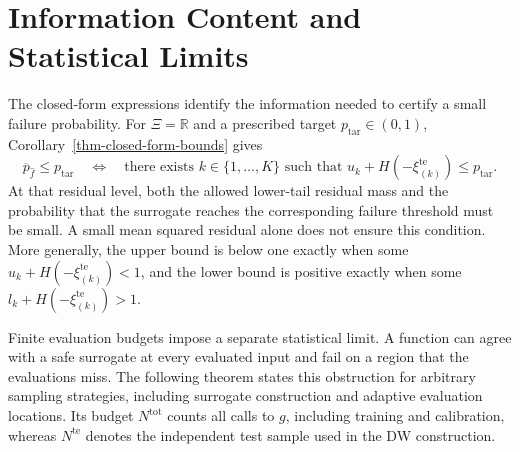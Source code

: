 \documentclass[review,11pt,3p,authoryear,nopreprintline]{elsarticle}
\begin{document}
\section{Information Content and Statistical Limits}
\label{sec-information}

The closed-form expressions identify the information needed to certify a small failure probability. For $\Xi=\mathbb R$ and a prescribed target $p_{\mathrm{tar}}\in(0,1)$, Corollary~\ref{thm-closed-form-bounds} gives
\begin{equation}
  \overline p_{\hat f}\le p_{\mathrm{tar}}
  \quad\Longleftrightarrow\quad
  \text{there exists }k\in\{1,\ldots,K\}\text{ such that }
  u_k+H\left(-\xi_{(k)}^{\mathrm{te}}\right)\le p_{\mathrm{tar}}.
  \label{eq-target-certification}
\end{equation}
At that residual level, both the allowed lower-tail residual mass and the probability that the surrogate reaches the corresponding failure threshold must be small. A small mean squared residual alone does not ensure this condition. More generally, the upper bound is below one exactly when some $u_k+H\left(-\xi_{(k)}^{\mathrm{te}}\right)<1$, and the lower bound is positive exactly when some $l_k+H\left(-\xi_{(k)}^{\mathrm{te}}\right)>1$.

Finite evaluation budgets impose a separate statistical limit. A function can agree with a safe surrogate at every evaluated input and fail on a region that the evaluations miss. The following theorem states this obstruction for arbitrary sampling strategies, including surrogate construction and adaptive evaluation locations. Its budget $N^{\mathrm{tot}}$ counts all calls to $g$, including training and calibration, whereas $N^{\mathrm{te}}$ denotes the independent test sample used in the DW construction.
\end{document}
